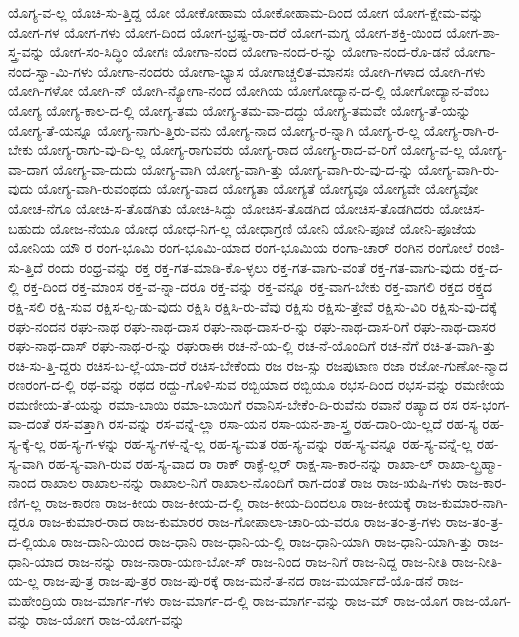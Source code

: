 {ಯೊಗ್ಯ-ವ-ಲ್ಲ
ಯೊಚಿ-ಸು-ತ್ತಿದ್ದ
ಯೋ
ಯೋಕೋಹಾಮ
ಯೋಕೋಹಾಮ-ದಿಂದ
ಯೋಗ
ಯೋಗ-ಕ್ಷೇಮ-ವನ್ನು
ಯೋಗ-ಗಳ
ಯೋಗ-ಗಳು
ಯೋಗ-ದಿಂದ
ಯೋಗ-ಭ್ರಷ್ಟ-ರಾ-ದರೆ
ಯೋಗ-ಮಗ್ನ
ಯೋಗ-ಶಕ್ತಿ-ಯಿಂದ
ಯೋಗ-ಶಾ-ಸ್ತ್ರ-ವನ್ನು
ಯೋಗ-ಸಂ-ಸಿದ್ಧಿಂ
ಯೋಗಃ
ಯೋಗಾ-ನಂದ
ಯೋಗಾ-ನಂದ-ರ-ನ್ನು
ಯೋಗಾ-ನಂದ-ರೊ-ಡನೆ
ಯೋಗಾ-ನಂದ-ಸ್ವಾ-ಮಿ-ಗಳು
ಯೋಗಾ-ನಂದರು
ಯೋಗಾ-ಭ್ಯಾಸ
ಯೋಗಾಚ್ಚಲಿತ-ಮಾನಸಃ
ಯೋಗಿ-ಗಳಾದ
ಯೋಗಿ-ಗಳು
ಯೋಗಿ-ಗಳೋ
ಯೋಗಿ-ನ್
ಯೋಗಿ-ನ್ಯೋಗಾ-ನಂದ
ಯೋಗಿಯ
ಯೋಗೋದ್ಯಾನ-ದ-ಲ್ಲಿ
ಯೋಗೋದ್ಯಾನ-ವೆಂಬ
ಯೋಗ್ಯ
ಯೋಗ್ಯ-ಕಾಲ-ದ-ಲ್ಲಿ
ಯೋಗ್ಯ-ತಮ
ಯೋಗ್ಯ-ತಮ-ವಾ-ದದ್ದು
ಯೋಗ್ಯ-ತಮವೇ
ಯೋಗ್ಯ-ತೆ-ಯನ್ನು
ಯೋಗ್ಯ-ತೆ-ಯನ್ನೂ
ಯೋಗ್ಯ-ನಾಗು-ತ್ತಿರು-ವನು
ಯೋಗ್ಯ-ನಾದ
ಯೋಗ್ಯ-ರ-ನ್ನಾಗಿ
ಯೋಗ್ಯ-ರ-ಲ್ಲ
ಯೋಗ್ಯ-ರಾಗಿ-ರ-ಬೇಕು
ಯೋಗ್ಯ-ರಾಗು-ವು-ದಿ-ಲ್ಲ
ಯೋಗ್ಯ-ರಾಗುವರು
ಯೋಗ್ಯ-ರಾದ
ಯೋಗ್ಯ-ರಾದ-ವ-ರಿಗೆ
ಯೋಗ್ಯ-ವ-ಲ್ಲ
ಯೋಗ್ಯ-ವಾ-ದಾಗ
ಯೋಗ್ಯ-ವಾ-ದುದು
ಯೋಗ್ಯ-ವಾಗಿ
ಯೋಗ್ಯ-ವಾಗಿ-ತ್ತು
ಯೋಗ್ಯ-ವಾಗಿ-ರು-ವು-ದ-ನ್ನು
ಯೋಗ್ಯ-ವಾಗಿ-ರು-ವುದು
ಯೋಗ್ಯ-ವಾಗಿ-ರುವಂಥದು
ಯೋಗ್ಯ-ವಾದ
ಯೋಗ್ಯತಾ
ಯೋಗ್ಯತೆ
ಯೋಗ್ಯವೂ
ಯೋಗ್ಯವೇ
ಯೋಗ್ಯವೋ
ಯೋಚ-ನೆಗೂ
ಯೋಚಿ-ಸ-ತೊಡಗಿತು
ಯೋಚಿ-ಸಿದ್ದು
ಯೋಚಿಸ-ತೊಡಗಿದ
ಯೋಚಿಸ-ತೊಡಗಿದರು
ಯೋಚಿಸ-ಬಹುದು
ಯೋಜ-ನೆಯೂ
ಯೋಧ
ಯೋಧ-ನಿಗ-ಲ್ಲ
ಯೋಧಾಗ್ರಣಿ
ಯೋನಿ
ಯೋನಿ-ಪೂಜೆ
ಯೋನಿ-ಪೂಜೆಯ
ಯೋನಿಯ
ಯೌ
ರ
ರಂಗ-ಭೂಮಿ
ರಂಗ-ಭೂಮಿ-ಯಾದ
ರಂಗ-ಭೂಮಿಯ
ರಂಗಾ-ಚಾರ್
ರಂಗಿನ
ರಂಗೋಲೆ
ರಂಜಿ-ಸು-ತ್ತಿದೆ
ರಂದು
ರಂಧ್ರ-ವನ್ನು
ರಕ್ತ
ರಕ್ತ-ಗತ-ಮಾಡಿ-ಕೊ-ಳ್ಳಲು
ರಕ್ತ-ಗತ-ವಾಗು-ವಂತೆ
ರಕ್ತ-ಗತ-ವಾಗು-ವುದು
ರಕ್ತ-ದ-ಲ್ಲಿ
ರಕ್ತ-ದಿಂದ
ರಕ್ತ-ಮಾಂಸ
ರಕ್ತ-ವ-ನ್ನಾ-ದರೂ
ರಕ್ತ-ವನ್ನು
ರಕ್ತ-ವನ್ನೂ
ರಕ್ತ-ವಾಗ-ಬೇಕು
ರಕ್ತ-ವಾಗಲಿ
ರಕ್ತದ
ರಕ್ತ್ತದ
ರಕ್ಷಿ-ಸಲಿ
ರಕ್ಷಿ-ಸುವ
ರಕ್ಷಿಸ-ಲ್ಪ-ಡು-ವುದು
ರಕ್ಷಿಸಿ
ರಕ್ಷಿಸಿ-ರು-ವೆವು
ರಕ್ಷಿಸು
ರಕ್ಷಿಸು-ತ್ತೇವೆ
ರಕ್ಷಿಸು-ವಿರಿ
ರಕ್ಷಿಸು-ವು-ದಕ್ಕೆ
ರಘು-ನಂದನ
ರಘು-ನಾಥ
ರಘು-ನಾಥ-ದಾಸ
ರಘು-ನಾಥ-ದಾಸ-ರ-ನ್ನು
ರಘು-ನಾಥ-ದಾಸ-ರಿಗೆ
ರಘು-ನಾಥ-ದಾಸರ
ರಘು-ನಾಥ-ದಾಸ್
ರಘು-ನಾಥ-ರ-ನ್ನು
ರಘುರಾಈ
ರಚ-ನೆ-ಯ-ಲ್ಲಿ
ರಚ-ನೆ-ಯೊಂದಿಗೆ
ರಚ-ನೆಗೆ
ರಚಿ-ತ-ವಾಗಿ-ತ್ತು
ರಚಿ-ಸು-ತ್ತಿ-ದ್ದರು
ರಚಿಸ-ಬ-ಲ್ಲೆ-ಯಾ-ದರೆ
ರಚಿಸ-ಬೇಕೆಂದು
ರಜ
ರಜ-ಸ್ಸು
ರಜಪುಟಾಣ
ರಜಾ
ರಜೋ-ಗುಣೋ-ನ್ಮಾದ
ರಣರಂಗ-ದ-ಲ್ಲಿ
ರಥ-ವನ್ನು
ರಥದ
ರದ್ದು-ಗೊಳಿ-ಸುವ
ರಬ್ಬಿಯಾದ
ರಬ್ಬಿಯೂ
ರಭಸ-ದಿಂದ
ರಭಸ-ವನ್ನು
ರಮಣೀಯ
ರಮಣೀಯ-ತೆ-ಯನ್ನು
ರಮಾ-ಬಾಯಿ
ರಮಾ-ಬಾಯಿಗೆ
ರವಾನಿಸ-ಬೇಕೆಂ-ದಿ-ರುವೆನು
ರವಾನೆ
ರಷ್ಯಾದ
ರಸ
ರಸ-ಭಂಗ-ವಾ-ದಂತೆ
ರಸ-ವತ್ತಾಗಿ
ರಸ-ವನ್ನು
ರಸ-ವನ್ನೆ-ಲ್ಲಾ
ರಸಾ-ಯನ
ರಸಾ-ಯನ-ಶಾ-ಸ್ತ್ರ
ರಹ-ದಾರಿ-ಯಿ-ಲ್ಲದೆ
ರಹ-ಸ್ಯ
ರಹ-ಸ್ಯ-ಕ್ಕೆ-ಲ್ಲ
ರಹ-ಸ್ಯ-ಗ-ಳನ್ನು
ರಹ-ಸ್ಯ-ಗಳ-ನ್ನೆ-ಲ್ಲ
ರಹ-ಸ್ಯ-ಮತ
ರಹ-ಸ್ಯ-ವನ್ನು
ರಹ-ಸ್ಯ-ವನ್ನೂ
ರಹ-ಸ್ಯ-ವನ್ನೆ-ಲ್ಲ
ರಹ-ಸ್ಯ-ವಾಗಿ
ರಹ-ಸ್ಯ-ವಾಗಿ-ರುವ
ರಹ-ಸ್ಯ-ವಾದ
ರಾ
ರಾಕ್
ರಾಕ್ಫೆ-ಲ್ಲರ್
ರಾಕ್ಷ-ಸಾ-ಕಾರ-ನನ್ನು
ರಾಖಾ-ಲ್
ರಾಖಾ-ಲ್ಬ್ರಹ್ಮಾ-ನಾಂದ
ರಾಖಾಲ
ರಾಖಾಲ-ನನ್ನು
ರಾಖಾಲ-ನಿಗೆ
ರಾಖಾಲ-ನೊಂದಿಗೆ
ರಾಗ-ದಂತೆ
ರಾಜ
ರಾಜ-ಋಷಿ-ಗಳು
ರಾಜ-ಕಾರ-ಣಿಗ-ಲ್ಲ
ರಾಜ-ಕಾರಣ
ರಾಜ-ಕೀಯ
ರಾಜ-ಕೀಯ-ದ-ಲ್ಲಿ
ರಾಜ-ಕೀಯ-ದಿಂದಲೂ
ರಾಜ-ಕೀಯಕ್ಕೆ
ರಾಜ-ಕುಮಾರ-ನಾಗಿ-ದ್ದರೂ
ರಾಜ-ಕುಮಾರ-ರಾದ
ರಾಜ-ಕುಮಾರರ
ರಾಜ-ಗೋಪಾಲಾ-ಚಾರಿ-ಯ-ವರೂ
ರಾಜ-ತಂ-ತ್ರ-ಗಳು
ರಾಜ-ತಂ-ತ್ರ-ದ-ಲ್ಲಿಯೂ
ರಾಜ-ದಾನಿ-ಯಿಂದ
ರಾಜ-ಧಾನಿ
ರಾಜ-ಧಾನಿ-ಯ-ಲ್ಲಿ
ರಾಜ-ಧಾನಿ-ಯಾಗಿ
ರಾಜ-ಧಾನಿ-ಯಾಗಿ-ತ್ತು
ರಾಜ-ಧಾನಿ-ಯಾದ
ರಾಜ-ನನ್ನು
ರಾಜ-ನಾರಾ-ಯಣ-ಬೋ-ಸ್
ರಾಜ-ನಿಂದ
ರಾಜ-ನಿಗೆ
ರಾಜ-ನಿದ್ದ
ರಾಜ-ನೀತಿ
ರಾಜ-ನೀತಿ-ಯ-ಲ್ಲ
ರಾಜ-ಪು-ತ್ರ
ರಾಜ-ಪು-ತ್ರರ
ರಾಜ-ಪು-ರಕ್ಕೆ
ರಾಜ-ಮನೆ-ತ-ನದ
ರಾಜ-ಮರ್ಯಾದೆ-ಯೊ-ಡನೆ
ರಾಜ-ಮಹೇಂದ್ರಿಯ
ರಾಜ-ಮಾರ್ಗ-ಗಳು
ರಾಜ-ಮಾರ್ಗ-ದ-ಲ್ಲಿ
ರಾಜ-ಮಾರ್ಗ-ವನ್ನು
ರಾಜ-ಮ್
ರಾಜ-ಯೊಗ
ರಾಜ-ಯೊಗ-ವನ್ನು
ರಾಜ-ಯೋಗ
ರಾಜ-ಯೋಗ-ವನ್ನು
}
